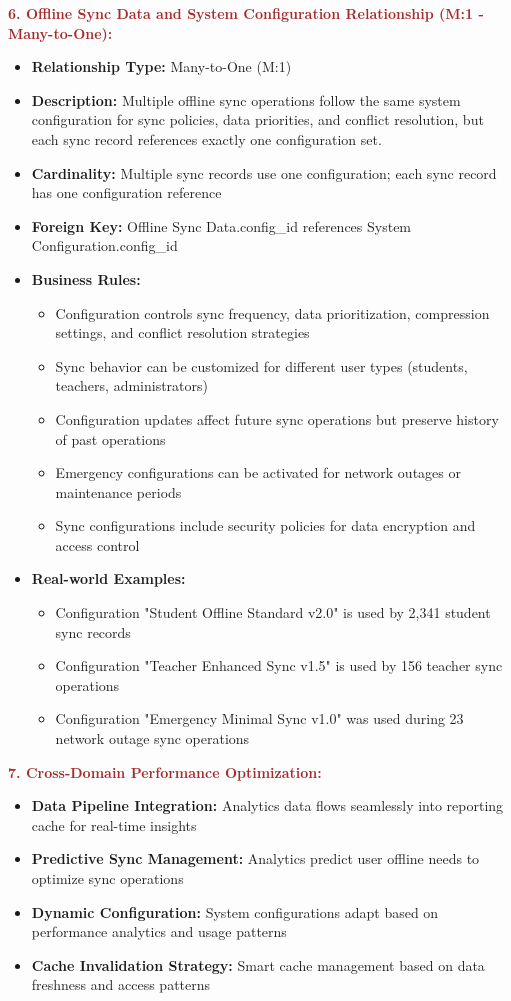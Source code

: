 \documentclass[12pt,a4paper,oneside]{book}
\begin{document}
\textbf{\textcolor{brown}{6. Offline Sync Data and System Configuration Relationship (M:1 - Many-to-One):}}
\begin{itemize}
    \item \textbf{Relationship Type:} Many-to-One (M:1)
    \item \textbf{Description:} Multiple offline sync operations follow the same system configuration for sync policies, data priorities, and conflict resolution, but each sync record references exactly one configuration set.
    \item \textbf{Cardinality:} Multiple sync records use one configuration; each sync record has one configuration reference
    \item \textbf{Foreign Key:} Offline Sync Data.config\_id references System Configuration.config\_id
    \item \textbf{Business Rules:}
        \begin{itemize}
            \item Configuration controls sync frequency, data prioritization, compression settings, and conflict resolution strategies
            \item Sync behavior can be customized for different user types (students, teachers, administrators)
            \item Configuration updates affect future sync operations but preserve history of past operations
            \item Emergency configurations can be activated for network outages or maintenance periods
            \item Sync configurations include security policies for data encryption and access control
        \end{itemize}
    \item \textbf{Real-world Examples:}
        \begin{itemize}
            \item Configuration "Student Offline Standard v2.0" is used by 2,341 student sync records
            \item Configuration "Teacher Enhanced Sync v1.5" is used by 156 teacher sync operations
            \item Configuration "Emergency Minimal Sync v1.0" was used during 23 network outage sync operations
        \end{itemize}
\end{itemize}

\textbf{\textcolor{brown}{7. Cross-Domain Performance Optimization:}}
\begin{itemize}
    \item \textbf{Data Pipeline Integration:} Analytics data flows seamlessly into reporting cache for real-time insights
    \item \textbf{Predictive Sync Management:} Analytics predict user offline needs to optimize sync operations
    \item \textbf{Dynamic Configuration:} System configurations adapt based on performance analytics and usage patterns
    \item \textbf{Cache Invalidation Strategy:} Smart cache management based on data freshness and access patterns
\end{itemize}
\end{document}
